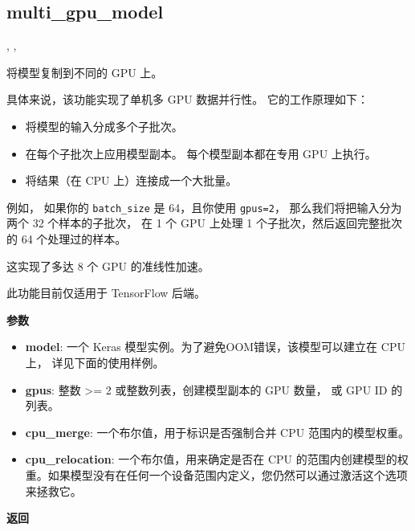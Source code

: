 \subsection{multi\_gpu\_model}\label{multi-gpu-model}

\begin{Shaded}
\begin{Highlighting}[]
\OperatorTok{=},
\OperatorTok{=},
\OperatorTok{=}\NormalTok{)}
\end{Highlighting}
\end{Shaded}

将模型复制到不同的 GPU 上。

具体来说，该功能实现了单机多 GPU 数据并行性。 它的工作原理如下：

\begin{itemize}
\tightlist
\item
  将模型的输入分成多个子批次。
\item
  在每个子批次上应用模型副本。 每个模型副本都在专用 GPU 上执行。
\item
  将结果（在 CPU 上）连接成一个大批量。
\end{itemize}

例如， 如果你的 \texttt{batch\_size} 是 64，且你使用 \texttt{gpus=2}，
那么我们将把输入分为两个 32 个样本的子批次， 在 1 个 GPU 上处理 1
个子批次，然后返回完整批次的 64 个处理过的样本。

这实现了多达 8 个 GPU 的准线性加速。

此功能目前仅适用于 TensorFlow 后端。

\textbf{参数}

\begin{itemize}
\tightlist
\item
  \textbf{model}: 一个 Keras 模型实例。为了避免OOM错误，该模型可以建立在
  CPU 上， 详见下面的使用样例。
\item
  \textbf{gpus}: 整数 \textgreater{}= 2 或整数列表，创建模型副本的 GPU
  数量， 或 GPU ID 的列表。
\item
  \textbf{cpu\_merge}: 一个布尔值，用于标识是否强制合并 CPU
  范围内的模型权重。
\item
  \textbf{cpu\_relocation}: 一个布尔值，用来确定是否在 CPU
  的范围内创建模型的权重。如果模型没有在任何一个设备范围内定义，您仍然可以通过激活这个选项来拯救它。
\end{itemize}

\textbf{返回}


